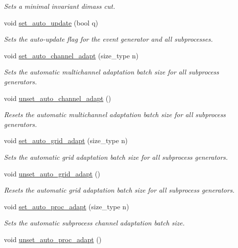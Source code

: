 \begin{DoxyCompactItemize}
\begin{DoxyCompactList}\small\item\em Sets a minimal invariant dimass cut. \end{DoxyCompactList}\item 
void \hyperlink{a00212_ad42b308b9ba23af048890ce001c030d2}{set\+\_\+auto\+\_\+update} (bool q)
\begin{DoxyCompactList}\small\item\em Sets the auto-\/update flag for the event generator and all subprocesses. \end{DoxyCompactList}\item 
void \hyperlink{a00212_a282384cafa65698ff2f83c3f44a5062c}{set\+\_\+auto\+\_\+channel\+\_\+adapt} (size\+\_\+type n)
\begin{DoxyCompactList}\small\item\em Sets the automatic multichannel adaptation batch size for all subprocess generators. \end{DoxyCompactList}\item 
void \hyperlink{a00212_aba9c35d889ecf3d604ffaa3351189281}{unset\+\_\+auto\+\_\+channel\+\_\+adapt} ()
\begin{DoxyCompactList}\small\item\em Resets the automatic multichannel adaptation batch size for all subprocess generators. \end{DoxyCompactList}\item 
void \hyperlink{a00212_a53d7227457f76185f7c53ac126fdece6}{set\+\_\+auto\+\_\+grid\+\_\+adapt} (size\+\_\+type n)
\begin{DoxyCompactList}\small\item\em Sets the automatic grid adaptation batch size for all subprocess generators. \end{DoxyCompactList}\item 
void \hyperlink{a00212_a5fe8988e5090b3b70aff590c1b0b2fbb}{unset\+\_\+auto\+\_\+grid\+\_\+adapt} ()
\begin{DoxyCompactList}\small\item\em Resets the automatic grid adaptation batch size for all subprocess generators. \end{DoxyCompactList}\item 
\hypertarget{a00212_aea8c67081c9dc3c8db030451ec44a487}{}void \hyperlink{a00212_aea8c67081c9dc3c8db030451ec44a487}{set\+\_\+auto\+\_\+proc\+\_\+adapt} (size\+\_\+type n)\label{a00212_aea8c67081c9dc3c8db030451ec44a487}

\begin{DoxyCompactList}\small\item\em Sets the automatic subprocess channel adaptation batch size. \end{DoxyCompactList}\item 
\hypertarget{a00212_a753b23a599fe1992ef49fb61c5489293}{}void \hyperlink{a00212_a753b23a599fe1992ef49fb61c5489293}{unset\+\_\+auto\+\_\+proc\+\_\+adapt} ()\label{a00212_a753b23a599fe1992ef49fb61c5489293}


\end{DoxyCompactItemize}
